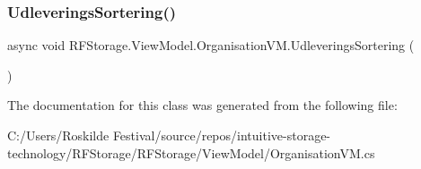 \subsubsection{\texorpdfstring{UdleveringsSortering()}{UdleveringsSortering()}}
{\footnotesize\ttfamily async void R\+F\+Storage.\+View\+Model.\+Organisation\+V\+M.\+Udleverings\+Sortering (\begin{DoxyParamCaption}{ }\end{DoxyParamCaption})}







The documentation for this class was generated from the following file\+:\begin{DoxyCompactItemize}
\item 
C\+:/\+Users/\+Roskilde Festival/source/repos/intuitive-\/storage-\/technology/\+R\+F\+Storage/\+R\+F\+Storage/\+View\+Model/Organisation\+V\+M.\+cs\end{DoxyCompactItemize}

